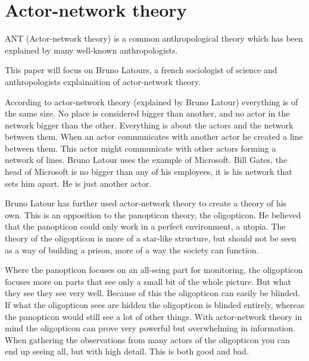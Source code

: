\section{Actor-network theory}
ANT (Actor-network theory) is a common anthropological theory which has been explained by many well-known anthropologists.

This paper will focus on Bruno Latours, a french sociologist of science and anthropologists explainaition of actor-network theory.

According to actor-network theory (explained by Bruno Latour) everything is of the same size. No place is considered bigger than another, and no actor in the network bigger than the other. Everything is about the actors and the network between them. When an actor communicates with another actor he created a line between them. This actor might communicate with other actors forming a network of lines.
Bruno Latour uses the example of Microsoft. Bill Gates, the head of Microsoft is no bigger than any of his employees, it is his network that sets him apart. He is just another actor.\cite{bookref:actor-network}

Bruno Latour has further used actor-network theory to create a theory of his own. This is an opposition to the panopticon theory, the oligopticon. He believed that the panopticon could only work in a perfect environment, a utopia. The theory of the oligopticon is more of a star-like structure, but should not be seen as a way of building a prison, more of a way the society can function.

Where the panopticon focuses on an all-seing part for monitoring, the oligopticon focuses more on parts that see only a small bit of the whole picture. But what they see they see very well. Because of this the oligopticon can easily be blinded. If what the oligopticon sees are hidden the oligopticon is blinded entirely, whereas the panopticon would still see a lot of other things. With actor-network theory in mind the oligopticon can prove very powerful but overwhelming in information. When gathering the observations from many actors of the oligopticon you can end up seeing all, but with high detail. This is both good and bad.

\newpage

